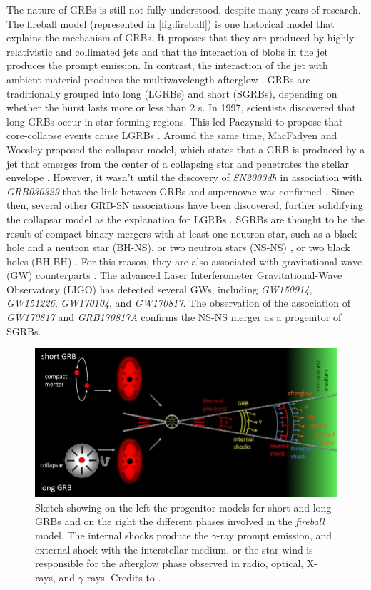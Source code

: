 The nature of GRBs is still not fully understood, despite many years of research. The fireball model (represented in \autoref{fig:fireball}) is one historical model that explains the mechanism of GRBs. It proposes that they are produced by highly relativistic and collimated jets and that the interaction of blobs in the jet produces the prompt emission. In contrast, the interaction of the jet with ambient material produces the multiwavelength afterglow \cite{Bhat_2011}. GRBs are traditionally grouped into long (LGRBs) and short (SGRBs), depending on whether the burst lasts more or less than 2 s. In 1997, scientists discovered that long GRBs occur in star-forming regions. This led Paczynski to propose that core-collapse events cause LGRBs \cite{paczynski_1998}. Around the same time, MacFadyen and Woosley proposed the collapsar model, which states that a GRB is produced by a jet that emerges from the center of a collapsing star and penetrates the stellar envelope \cite{macfadyen_woosley_1999}. However, it wasn't until the discovery of \textit{SN2003dh} in association with \textit{GRB030329} that the link between GRBs and supernovae was confirmed \cite{hjorth_et_al_2003}. Since then, several other GRB-SN associations have been discovered, further solidifying the collapsar model as the explanation for LGRBs \cite{bromberg2012observational}. SGRBs are thought to be the result of compact binary mergers with at least one neutron star, such as a black hole and a neutron star (BH-NS), or two neutron stars (NS-NS) \cite{cohen1995distribution}, or two black holes (BH-BH) \cite{Perna_2016}. For this reason, they are also associated with 
gravitational wave (GW) counterparts \cite{abbott_et_al_2017}. The advanced Laser Interferometer Gravitational-Wave Observatory (LIGO) has detected several GWs, including \textit{GW150914}, \textit{GW151226}, \textit{GW170104}, and \textit{GW170817}. The observation of the association of \textit{GW170817} and \textit{GRB170817A} \cite{abbott_et_al_2017} confirms the NS-NS merger as a progenitor of SGRBs.
 \begin{figure}[t]
\centering
\includegraphics[width=1\linewidth]{figures/introduction/grb-fireball.png}
\caption{Sketch showing on the left the progenitor models for short and long GRBs and on the right the different phases involved in the \textit{fireball} model. The internal shocks produce the $\gamma$-ray prompt emission, and external shock with the interstellar medium, or the star wind is responsible
for the afterglow phase observed in radio, optical, X-rays, and $\gamma$-rays. Credits to \cite{Gomboc_2012}.}
\label{fig:fireball}
\end{figure}


